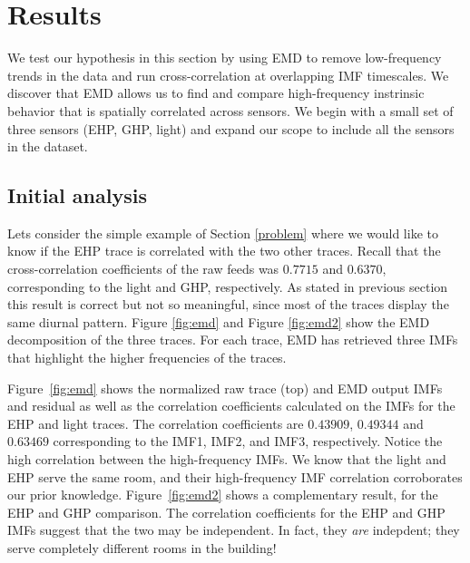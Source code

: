 \section{Results}


We test our hypothesis in this section by using EMD to remove low-frequency trends in the data
and run cross-correlation at overlapping IMF timescales.  We discover that EMD allows us
to find and compare high-frequency instrinsic behavior that is spatially correlated across
sensors.  We begin with a small set of three sensors (EHP, GHP, light) and expand our scope
to include all the sensors in the dataset.


\subsection{Initial analysis}
Lets consider the simple example of Section \ref{problem} where we would like to know if the EHP trace is correlated with the two other traces.
Recall that the cross-correlation coefficients of the raw feeds was $0.7715$ and $0.6370$, corresponding to the light 
and GHP, respectively.
As stated in previous section this result is correct but not so meaningful, since most of the traces
display the same diurnal pattern.
Figure \ref{fig:emd} and Figure \ref{fig:emd2} show the EMD decomposition of the three traces.
For each trace, EMD has retrieved three IMFs that highlight the higher frequencies of the traces.

Figure~\ref{fig:emd} shows the normalized raw trace (top) and EMD output IMFs and residual as well as the 
correlation coefficients calculated on the IMFs for the EHP and
light traces.  The correlation coefficients are $0.43909$, $0.49344$ and $0.63469$ corresponding to the IMF1, 
IMF2, and IMF3, respectively.  Notice the high correlation between the high-frequency IMFs.
We know that the light and EHP serve the same room, and their high-frequency IMF correlation corroborates
our prior knowledge.
Figure~\ref{fig:emd2} shows a complementary result, for the EHP and GHP comparison.
The correlation coefficients for the EHP and GHP IMFs suggest that the two may be independent.  In fact, they
\emph{are} indepdent; they serve completely different rooms in the building!

